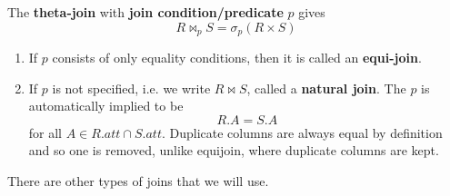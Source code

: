 \documentclass{article}
\begin{document}
    \begin{definition}
      The \textbf{theta-join} with \textbf{join condition/predicate} $p$ gives 
      \begin{equation}
        R \bowtie_p S = \sigma_p (R \times S)
      \end{equation}
      \begin{enumerate}
        \item If $p$ consists of only equality conditions, then it is called an \textbf{equi-join}. 
        \item If $p$ is not specified, i.e. we write $R \bowtie S$, called a \textbf{natural join}. The $p$ is automatically implied to be 
          \begin{equation}
            R.A = S.A
          \end{equation}
          for all $A \in R.att \cap S.att$. Duplicate columns are always equal by definition and so one is removed, unlike equijoin, where duplicate columns are kept. 
      \end{enumerate}
    \end{definition}

    There are other types of joins that we will use. 
\end{document}
